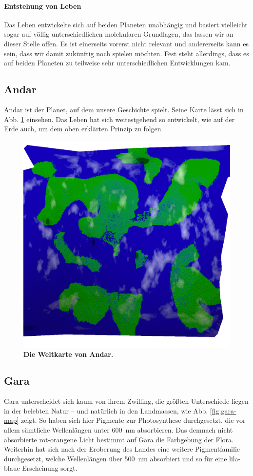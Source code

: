\paragraph{Entstehung von Leben}
Das Leben entwickelte sich auf beiden Planeten unabhängig und basiert vielleicht sogar auf völlig unterschiedlichen molekularen Grundlagen, das lassen wir an dieser Stelle offen.
Es ist einerseits vorerst nicht relevant und andererseits kann es sein, dass wir damit zukünftig noch spielen möchten.
Fest steht allerdings, dass es auf beiden Planeten zu teilweise sehr unterschiedlichen Entwicklungen kam. 


\subsection{Andar} \label{sec:planet}
Andar ist der Planet, auf dem unsere Geschichte spielt.
Seine Karte lässt sich in Abb. \ref{fig:andar-map} einsehen.
Das Leben hat sich weitestgehend so entwickelt, wie auf der Erde auch, um dem oben erklärten Prinzip zu folgen.

\begin{figure}[tbh]
	\centering
	\includegraphics[width=0.7\linewidth]{Abbildungen/Weltenbau/Welt/andar-map}
	\caption[Weltkarte von Andar]{\textbf{Die Weltkarte von Andar.}}
	\label{fig:andar-map}
\end{figure}


\subsection{Gara} \label{sec:planet-zwilling}
Gara unterscheidet sich kaum von ihrem Zwilling, die größten Unterschiede liegen in der belebten Natur -- und natürlich in den Landmassen, wie Abb. \ref{fig:gara-map} zeigt.
So haben sich hier Pigmente zur Photosynthese durchgesetzt, die vor allem sämtliche Wellenlängen unter \SI{600}{\nano\meter} absorbieren.
Das demnach nicht absorbierte rot-orangene Licht bestimmt auf Gara die Farbgebung der Flora.
Weiterhin hat sich nach der Eroberung des Landes eine weitere Pigmentfamilie durchgesetzt, welche Wellenlängen über \SI{500}{\nano\meter} absorbiert und so für eine lila-blaue Erscheinung sorgt.

